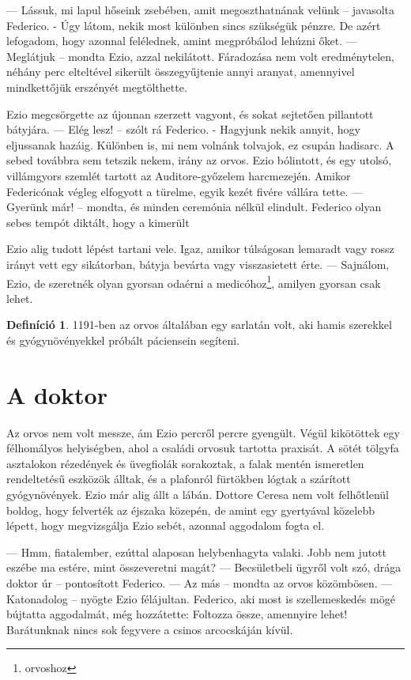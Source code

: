 \documentclass{thesis-ekf}
\theoremstyle{definition}
\newtheorem{definicio}{Definíció}[section]
\theoremstyle{remark}
\begin{document}
— Lássuk,  mi  lapul  hőseink  zsebében,  amit  megoszthatnának 
velünk -- javasolta Federico. - Úgy látom, nekik most különben sincs 
szükségük  pénzre.  De  azért  lefogadom,  hogy  azonnal  felélednek, 
amint megpróbálod lehúzni őket. 
— Meglátjuk -- mondta Ezio, azzal nekilátott. Fáradozása nem volt eredménytelen, néhány perc elteltével sikerült összegyűjtenie annyi 
aranyat,  amennyivel  mindkettőjük  erszényét  megtölthette.  

Ezio megcsörgette  az  újonnan  szerzett  vagyont,  és  sokat  sejtetően 
pillantott bátyjára. 
— Elég lesz! -- szólt rá Federico. - Hagyjunk nekik annyit, hogy eljussanak hazáig. Különben is, mi nem volnánk tolvajok, ez csupán hadisarc. A sebed továbbra sem tetszik nekem, irány az orvos. 
Ezio  bólintott,  és  egy  utolsó,  villámgyors  szemlét  tartott  az 
Auditore-győzelem  harcmezején.  Amikor  Federicónak  végleg 
elfogyott a türelme, egyik kezét fivére vállára tette. 
— Gyerünk már! -- mondta, és minden ceremónia nélkül elindult. 
Federico  olyan  sebes  tempót  diktált,  hogy  a  kimerült  

Ezio  alig tudott  lépést  tartani  vele.  Igaz,  amikor  túlságosan  lemaradt  vagy 
rossz  irányt  vett  egy  sikátorban,  bátyja  bevárta  vagy  visszasietett 
érte. 
— Sajnálom,  Ezio,  de  szeretnék  olyan  gyorsan  odaérni  a 
medicóhoz\footnote{orvoshoz}, amilyen gyorsan csak lehet. 

\begin{definicio}\label{definicio}
    1191-ben az orvos általában egy sarlatán volt, aki hamis szerekkel és gyógynövényekkel próbált páciensein segíteni.
 \end{definicio}

\section{A doktor}
Az orvos nem volt messze, ám Ezio percről percre gyengült. Végül 
kikötöttek  egy  félhomályos  helyiségben,  ahol  a  családi  orvosuk 
tartotta praxisát. A sötét tölgyfa asztalokon rézedények és üvegfiolák 
sorakoztak, a falak mentén ismeretlen rendeltetésű eszközök álltak, 
és a plafonról fürtökben lógtak a szárított gyógynövények. Ezio már 
alig állt a lábán. 
\smallskip
Dottore  Ceresa  nem  volt  felhőtlenül  boldog,  hogy  felverték  az 
éjszaka  közepén,  de  amint  egy  gyertyával  közelebb  lépett,  hogy 
megvizsgálja Ezio sebét, azonnal aggodalom fogta el.

— Hmm, fiatalember, ezúttal alaposan helybenhagyta valaki. Jobb 
nem jutott eszébe ma estére, mint összeveretni magát? 
— Becsületbeli  ügyről  volt  szó,  drága  doktor  úr  --  pontosított 
Federico. 
— Az más -- mondta az orvos közömbösen. 
— Katonadolog -- nyögte Ezio félájultan. 
Federico, aki most is szellemeskedés mögé bújtatta aggodalmát, 
még hozzátette: 
Foltozza össze, amennyire lehet! Barátunknak nincs sok fegyvere a 
csinos arcocskáján kívül. 
\end{document}

